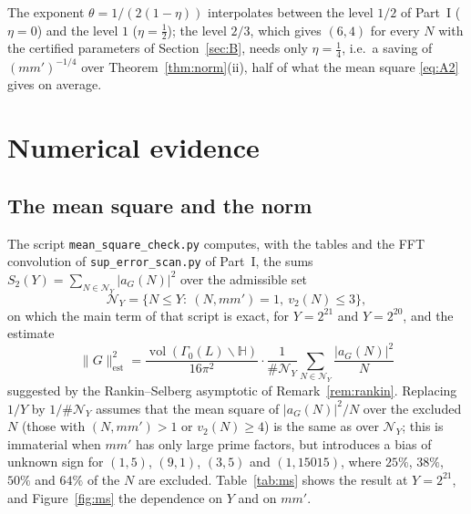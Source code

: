 ﻿\documentclass[11pt]{amsart}
\theoremstyle{remark}
\newcommand{\HH}{\mathbb{H}}
\DeclareMathOperator{\vol}{vol}
\begin{document}
The exponent $\theta=1/(2(1-\eta))$ interpolates between the level $1/2$ of Part~I ($\eta=0$) and the level $1$ ($\eta=\frac12$); the level $2/3$, which gives $(6,4)$ for every $N$ with the certified parameters of Section~\ref{sec:B}, needs only $\eta=\frac14$, i.e.\ a saving of $(mm')^{-1/4}$ over Theorem~\ref{thm:norm}(ii), half of what the mean square \eqref{eq:A2} gives on average.

\section{Numerical evidence}\label{sec:num}

\subsection{The mean square and the norm}
The script \texttt{mean\_square\_check.py} computes, with the tables and the FFT convolution of \texttt{sup\_error\_scan.py} of Part~I, the sums $S_2(Y)=\sum_{N\in\mathcal N_Y}|a_G(N)|^2$ over the admissible set
\[
\mathcal N_Y=\{N\le Y:\ (N,mm')=1,\ v_2(N)\le3\},
\]
on which the main term of that script is exact, for $Y=2^{21}$ and $Y=2^{20}$, and the estimate
\[
\|G\|^2_{\mathrm{est}}=\frac{\vol(\Gamma_0(L)\backslash\HH)}{16\pi^2}\cdot\frac{1}{\#\mathcal N_Y}\sum_{N\in\mathcal N_Y}\frac{|a_G(N)|^2}{N}
\]
suggested by the Rankin--Selberg asymptotic of Remark~\ref{rem:rankin}. Replacing $1/Y$ by $1/\#\mathcal N_Y$ assumes that the mean square of $|a_G(N)|^2/N$ over the excluded $N$ (those with $(N,mm')>1$ or $v_2(N)\ge4$) is the same as over $\mathcal N_Y$; this is immaterial when $mm'$ has only large prime factors, but introduces a bias of unknown sign for $(1,5)$, $(9,1)$, $(3,5)$ and $(1,15015)$, where $25\%$, $38\%$, $50\%$ and $64\%$ of the $N$ are excluded. Table~\ref{tab:ms} shows the result at $Y=2^{21}$, and Figure~\ref{fig:ms} the dependence on $Y$ and on $mm'$.
\end{document}
